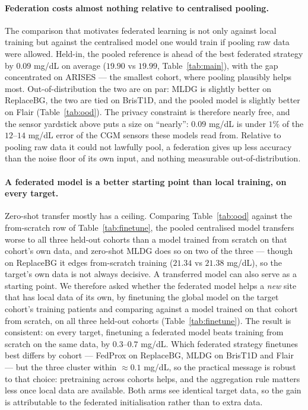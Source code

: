\documentclass[10pt,letterpaper]{article}
\begin{document}
\paragraph{Federation costs almost nothing relative to centralised pooling.}
The comparison that motivates federated learning is not only against local
training but against the centralised model one would train if pooling raw data
were allowed. Held-in, the pooled reference is ahead of the best federated
strategy by $0.09$ mg/dL on average ($19.90$ vs $19.99$,
Table~\ref{tab:main}), with the gap concentrated on ARISES --- the smallest
cohort, where pooling plausibly helps most. Out-of-distribution the two are on
par: MLDG is slightly better on ReplaceBG, the two are tied on BrisT1D, and the
pooled model is slightly better on Flair (Table~\ref{tab:ood}). The privacy
constraint is therefore nearly free, and the sensor yardstick above puts a size
on ``nearly'': $0.09$ mg/dL is under $1\%$ of the $12$--$14$ mg/dL error of the
CGM sensors these models read from. Relative to pooling raw data it could not
lawfully pool, a federation gives up less accuracy than the noise floor of its
own input, and nothing measurable out-of-distribution.

\paragraph{A federated model is a better starting point than local training, on
every target.} Zero-shot transfer mostly has a ceiling. Comparing
Table~\ref{tab:ood} against the from-scratch row of Table~\ref{tab:finetune},
the pooled centralised model transfers worse to all three held-out cohorts than
a model trained from scratch on that cohort's own data, and zero-shot MLDG does
so on two of the three --- though on ReplaceBG it edges from-scratch training
($21.34$ vs $21.38$ mg/dL), so the target's own data is not always decisive. A
transferred model can also serve as a starting point. We therefore asked whether the federated
model helps a \emph{new} site that has local data of its own, by finetuning the
global model on the target cohort's training patients and comparing against a
model trained on that cohort from scratch, on all three held-out cohorts
(Table~\ref{tab:finetune}). The
result is consistent: on every target, finetuning a federated model beats training
from scratch on the same data, by $0.3$--$0.7$ mg/dL. Which federated strategy
finetunes best differs by cohort
--- FedProx on ReplaceBG, MLDG on BrisT1D and
Flair --- but the three cluster within $\approx 0.1$ mg/dL, so the practical
message is robust to that choice: pretraining across cohorts helps, and the
aggregation rule matters less once local data are available. Both arms see
identical target data, so the gain is attributable to the federated
initialisation rather than to extra data.
\end{document}
